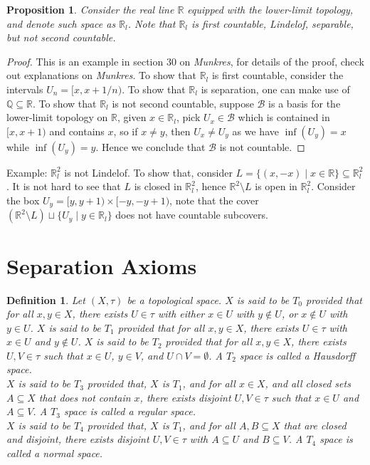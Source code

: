 \documentclass[11pt]{book}
\theoremstyle{break}
\theoremstyle{break}
\newtheorem{prop}[lem]{Proposition}
\newtheorem{defn}{Definition}[corL]
\newcommand{\R}{\mathbb{R}}
\newcommand{\Q}{\mathbb{Q}}
\newcommand{\example}{\color{green}Example: \color{black}}
\begin{document}
\begin{prop} Consider the real line $\R$ equipped with the lower-limit topology, and denote such space as $\R_l$. Note that $\R_l$ is first countable, Lindelof, separable, but not second countable. 
\end{prop}
\begin{proof}
This is an example in section 30 on \textit{Munkres}, for details of the proof, check out explanations on \textit{Munkres}. To show that $\R_l$ is first countable, consider the intervals $U_n = [x, x+1/n)$. To show that $\R_l$ is separation, one can make use of $\Q \subseteq \R$. To show that $\R_l$ is not second countable, suppose $\mathcal{B}$ is a basis for the lower-limit topology on $\R$, given $x \in \R_l$, pick $U_x\in \mathcal{B}$ which is contained in $[x,x+1)$ and contains $x$, so if $x \neq y$, then $U_x \neq U_y$ as we have $\inf(U_y) = x$ while $\inf(U_y) = y$. Hence we conclude that $\mathcal{B}$ is not countable. 
\end{proof}

\example $\R_l^2$ is not Lindelof. To show that, consider $L = \{(x,-x) \mid x \in \R\} \subseteq \R_l^2$. It is not hard to see that $L$ is closed in $\R_l^2$, hence $\R^2 \setminus L$ is open in $\R_l^2$. Consider the box $U_y = [y, y+1) \times [-y, -y+1)$, note that the cover $(\R^2\setminus L)\sqcup\{U_y\mid y \in \R_l\}$ does not have countable subcovers.


\newpage
\section[Separation Axioms]{\color{red}Separation Axioms \color{black}}
\begin{defn}
Let $(X,\tau)$ be a topological space. $X$ is said to be $T_0$ provided that for all $x,y \in X$, there exists $U\in \tau$ with either $x \in U$ with $y \notin U$, or $x \notin U$ with $y \in U$. $X$ is said to be $T_1$ provided that for all $x,y \in X$, there exists $U \in \tau$ with $x \in U$ and $y \notin U$. $X$ is said to be $T_2$ provided that for all $x,y \in X$, there exists $U,V \in \tau$ such that $x\in U$, $y \in V$, and $U \cap V = \emptyset$. A $T_2$ space is called a Hausdorff space. \\

$X$ is said to be $T_3$ provided that, $X$ is $T_1$, and for all $x \in X$, and all closed sets $A \subseteq X$ that does not contain $x$, there exists disjoint $U,V \in \tau$ such that $x \in U$ and $A\subseteq V$. A $T_3$ space is called a regular space.\\

$X$ is said to be $T_4$ provided that, $X$ is $T_1$, and for all $A,B \subseteq X$ that are closed and disjoint, there exists disjoint $U,V \in \tau$ with $A \subseteq U$ and $B \subseteq V$. A $T_4$ space is called a normal space. 
\end{defn}
\end{document}
